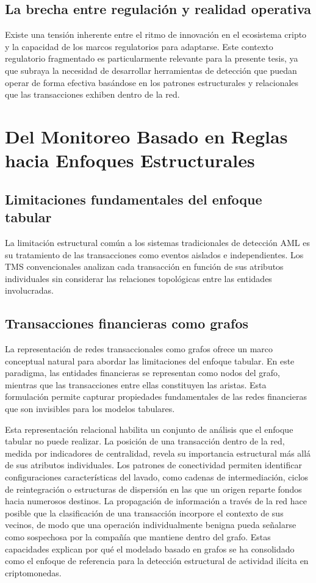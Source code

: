\subsection{La brecha entre regulación y realidad operativa}

Existe una tensión inherente entre el ritmo de innovación en el ecosistema cripto y la capacidad de los marcos regulatorios para adaptarse. Este contexto regulatorio fragmentado es particularmente relevante para la presente tesis, ya que subraya la necesidad de desarrollar herramientas de detección que puedan operar de forma efectiva basándose en los patrones estructurales y relacionales que las transacciones exhiben dentro de la red.


\section{Del Monitoreo Basado en Reglas hacia Enfoques Estructurales}

\subsection{Limitaciones fundamentales del enfoque tabular}

La limitación estructural común a los sistemas tradicionales de detección AML es su tratamiento de las transacciones como eventos aislados e independientes. Los TMS convencionales analizan cada transacción en función de sus atributos individuales sin considerar las relaciones topológicas entre las entidades involucradas.

\subsection{Transacciones financieras como grafos}

La representación de redes transaccionales como grafos ofrece un marco conceptual natural para abordar las limitaciones del enfoque tabular. En este paradigma, las entidades financieras se representan como nodos del grafo, mientras que las transacciones entre ellas constituyen las aristas. Esta formulación permite capturar propiedades fundamentales de las redes financieras que son invisibles para los modelos tabulares.

Esta representación relacional habilita un conjunto de análisis que el enfoque tabular no puede realizar. La posición de una transacción dentro de la red, medida por indicadores de centralidad, revela su importancia estructural más allá de sus atributos individuales. Los patrones de conectividad permiten identificar configuraciones características del lavado, como cadenas de intermediación, ciclos de reintegración o estructuras de dispersión en las que un origen reparte fondos hacia numerosos destinos. La propagación de información a través de la red hace posible que la clasificación de una transacción incorpore el contexto de sus vecinos, de modo que una operación individualmente benigna pueda señalarse como sospechosa por la compañía que mantiene dentro del grafo. Estas capacidades explican por qué el modelado basado en grafos se ha consolidado como el enfoque de referencia para la detección estructural de actividad ilícita en criptomonedas.

